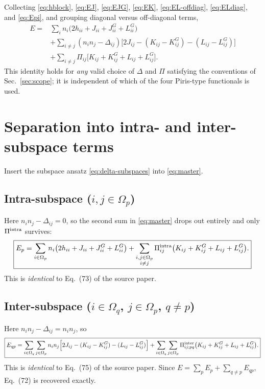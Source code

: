 \documentclass[11pt,a4paper]{article}
\newcommand{\PiMat}{\Pi}
\newcommand{\DeltaMat}{\Delta}
\newcommand{\Om}{\Omega}
\begin{document}
Collecting \eqref{eq:hblock}, \eqref{eq:EJ}, \eqref{eq:EJG},
\eqref{eq:EK}, \eqref{eq:EL-offdiag}, \eqref{eq:ELdiag}, and
\eqref{eq:Epi}, and grouping diagonal versus off-diagonal terms,
\begin{equation}
\boxed{
\begin{aligned}
E={}&\sum_in_i\big(2h_{ii}+J_{ii}+J^G_{ii}+L^G_{ii}\big)\\
&+\sum_{i\neq j}(n_in_j-\DeltaMat_{ij})\Big[2J_{ij}-(K_{ij}-K^G_{ij})-(L_{ij}-L^G_{ij})\Big]\\
&+\sum_{i\neq j}\PiMat_{ij}\Big[K_{ij}+K^G_{ij}+L_{ij}+L^G_{ij}\Big].
\end{aligned}
}
\label{eq:master}
\end{equation}
This identity holds for \emph{any} valid choice of $\DeltaMat$ and
$\PiMat$ satisfying the conventions of Sec.~\ref{sec:scope}; it is
independent of which of the four Piris-type functionals is used.

\section{Separation into intra- and inter-subspace terms}
\label{sec:separation}

Insert the subspace ansatz \eqref{eq:delta-subspaces} into
\eqref{eq:master}.

\subsection*{Intra-subspace ($i,j\in\Om_p$)}
Here $n_in_j-\DeltaMat_{ij}=0$, so the second sum in
\eqref{eq:master} drops out entirely and only $\PiMat^{\rm intra}$
survives:
\begin{equation}
\boxed{
E_p=\sum_{i\in\Om_p}n_i\big(2h_{ii}+J_{ii}+J^G_{ii}+L^G_{ii}\big)
+\sum_{\substack{i,j\in\Om_p\\i\neq j}}\PiMat^{\rm intra}_{ij}\big(K_{ij}+K^G_{ij}+L_{ij}+L^G_{ij}\big).
}
\label{eq:Ep}
\end{equation}
This is \emph{identical} to Eq.~(73) of the source paper.

\subsection*{Inter-subspace ($i\in\Om_q$, $j\in\Om_p$, $q\neq p$)}
Here $n_in_j-\DeltaMat_{ij}=n_in_j$, so
\begin{equation}
\boxed{
E_{qp}=\sum_{i\in\Om_q}\sum_{j\in\Om_p}n_in_j\Big[2J_{ij}-(K_{ij}-K^G_{ij})-(L_{ij}-L^G_{ij})\Big]
+\sum_{i\in\Om_q}\sum_{j\in\Om_p}\PiMat^{\rm inter}_{ij;pq}\big(K_{ij}+K^G_{ij}+L_{ij}+L^G_{ij}\big).
}
\label{eq:Eqp}
\end{equation}
This is \emph{identical} to Eq.~(75) of the source paper. Since
$E=\sum_pE_p+\sum_{q\neq p}E_{qp}$, Eq.~(72) is recovered exactly.
\end{document}

